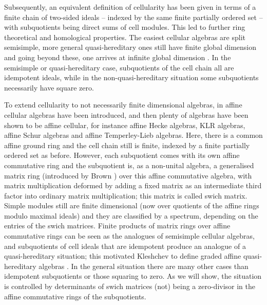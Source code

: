 \documentclass[oneside, a4paper, 11pt]{amsart}
\begin{document}
Subsequently, an equivalent definition of cellularity has been given
\cite{KXcellular} in
terms of a finite chain of  two-sided ideals -- indexed by the same finite
partially ordered set -- with subquotients being direct sums of cell modules.
This led to further ring theoretical and homological properties. The easiest
cellular algebras are split semisimple, more general quasi-hereditary ones
still have finite global dimension and going beyond these, one arrives at
infinite global dimension \cite{KXwhenis}.
In the semisimple or quasi-hereditary case,
subquotients of the cell chain all are idempotent ideals, while in the
non-quasi-hereditary situation some subquotients necessarily have square zero. 

To extend cellularity to not necessarily finite dimensional algebras, in
\cite{KXaffine} affine cellular algebras have been introduced,
and then plenty of algebras have been
shown to be affine cellular, for instance affine Hecke algebras,
KLR algebras, affine Schur algebras and affine Temperley-Lieb algebras.
Here, there is a common affine ground ring and the cell chain still is
finite, indexed by a finite partially ordered set as before. However,
each subquotient comes with its own affine commutative ring and the
subquotient is, as a non-unital algebra, a generalised matrix ring
(introduced by Brown \cite{Brown1955}) over this affine commutative algebra,
with matrix multiplication deformed by adding a fixed matrix as an
intermediate third factor into ordinary matrix multiplication;
this matrix is called swich matrix. Simple modules still are finite
dimensional (now over quotients of the affine rings modulo maximal ideals)
and they are classified by a spectrum, depending on the entries of
the swich matrices. Finite products
of matrix rings over affine commutative rings can
be seen as the analogues of semisimple cellular algebras, and subquotients of
cell ideals that are idempotent produce an analogue of a quasi-hereditary
situation; this motivated Kleshchev to define graded affine quasi-hereditary
algebras \cite{Kleshchev}. In the general situation there are many
other cases than idempotent subquotients or those squaring to zero. As we
will show, the situation is controlled by determinants of swich matrices
(not) being a zero-divisor in the affine commutative
rings of the subquotients. 
\end{document}

